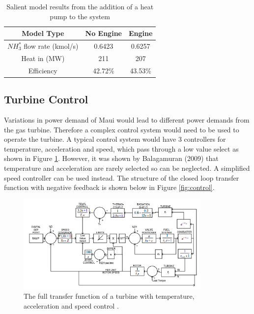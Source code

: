 \begin {table} [h]
\begin{center}
\caption{Salient model results from the addition of a heat pump to the system} \label{tab:heatengine} 
\begin{tabular}{ |c|c|c| }
 \hline
  Model Type & No Engine & Engine\\ 
  \hline
  $NH_3^*$ flow rate (kmol/s) & 0.6423 & 0.6257\\ 
 \hline
  Heat in (MW) & 211& 207\\
  \hline
  Efficiency & 42.72\% & 43.53\%\\
 \hline
\end{tabular}
\end{center}  
\end {table}

\subsection{Turbine Control}
Variations in power demand of Maui would lead to different power demands from the gas turbine. Therefore a complex control system would need to be used to operate the turbine. A typical control system would have 3 controllers for temperature, acceleration and speed, which pass through a low value select as shown in Figure \ref{fig:turbinecont}. However, it was shown by Balagamuran (2009) \cite{balagamuran} that temperature and acceleration are rarely selected so can be neglected. A simplified speed controller can be used instead. The structure of the closed loop transfer function with negative feedback is shown below in Figure \ref{fig:control}.

\begin{figure} [h]
\centering
\includegraphics[width=0.85\textwidth]{./pictures/turbinecont.png}
  \caption{The full transfer function of a turbine with temperature, acceleration and speed control \cite{balagamuran}.} \label{fig:turbinecont}
  \end{figure}
  
